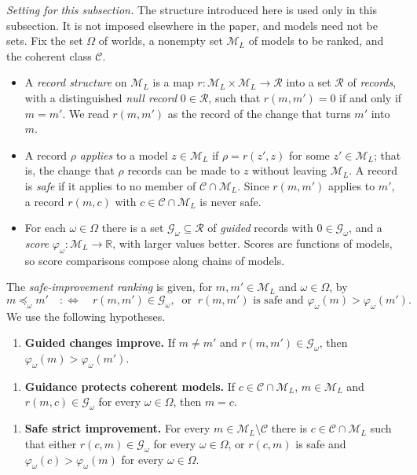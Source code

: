 \documentclass[11pt]{article}
\theoremstyle{definition}
\theoremstyle{remark}
\newcommand{\R}{\mathbb R}
\newcommand{\M}{\mathcal M}
\newcommand{\C}{\mathcal C}
\newcommand{\Rec}{\mathcal R}
\newcommand{\G}{\mathcal G}
\begin{document}
\emph{Setting for this subsection.} The structure introduced here is used only in this subsection. It is not imposed elsewhere in the paper, and models need not be sets. Fix the set $\Omega$ of worlds, a nonempty set $\M_L$ of models to be ranked, and the coherent class $\C$.
\begin{itemize}[leftmargin=*]
\item A \emph{record structure} on $\M_L$ is a map $r:\M_L\times\M_L\to\Rec$ into a set $\Rec$ of \emph{records}, with a distinguished \emph{null record} $0\in\Rec$, such that $r(m,m')=0$ if and only if $m=m'$. We read $r(m,m')$ as the record of the change that turns $m'$ into $m$.
\item A record $\rho$ \emph{applies} to a model $z\in\M_L$ if $\rho=r(z',z)$ for some $z'\in\M_L$; that is, the change that $\rho$ records can be made to $z$ without leaving $\M_L$. A record is \emph{safe} if it applies to no member of $\C\cap\M_L$. Since $r(m,m')$ applies to $m'$, a record $r(m,c)$ with $c\in\C\cap\M_L$ is never safe.
\item For each $\omega\in\Omega$ there is a set $\G_\omega\subseteq\Rec$ of \emph{guided} records with $0\in\G_\omega$, and a \emph{score} $\varphi_\omega:\M_L\to\R$, with larger values better. Scores are functions of models, so score comparisons compose along chains of models.
\end{itemize}
The \emph{safe-improvement ranking} is given, for $m,m'\in\M_L$ and $\omega\in\Omega$, by
\[
 m\preceq_\omega m' \quad:\Longleftrightarrow\quad r(m,m')\in\G_\omega,\ \text{ or }\ r(m,m')\text{ is safe and }\varphi_\omega(m)>\varphi_\omega(m').
\]
We use the following hypotheses.
\begin{enumerate}[label=\textbf{(GI)},leftmargin=*]
\item \textbf{Guided changes improve.} If $m\neq m'$ and $r(m,m')\in\G_\omega$, then $\varphi_\omega(m)>\varphi_\omega(m')$.
\end{enumerate}
\begin{enumerate}[label=\textbf{(GP)},leftmargin=*]
\item \textbf{Guidance protects coherent models.} If $c\in\C\cap\M_L$, $m\in\M_L$ and $r(m,c)\in\G_\omega$ for every $\omega\in\Omega$, then $m=c$.
\end{enumerate}
\begin{enumerate}[label=\textbf{(SI)},leftmargin=*]
\item \textbf{Safe strict improvement.} For every $m\in\M_L\setminus\C$ there is $c\in\C\cap\M_L$ such that either $r(c,m)\in\G_\omega$ for every $\omega\in\Omega$, or $r(c,m)$ is safe and $\varphi_\omega(c)>\varphi_\omega(m)$ for every $\omega\in\Omega$.
\end{enumerate}
\end{document}
